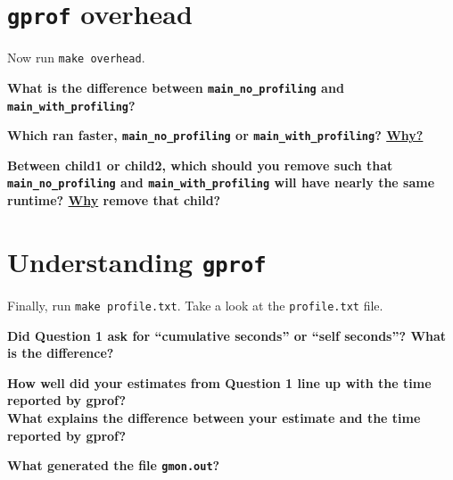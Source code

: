 \documentclass{article}
\begin{document}
\section{\texttt{gprof} overhead}

Now run \texttt{make~overhead}.

\textbf{What is the difference between \texttt{main\_no\_profiling} and
  \texttt{main\_with\_profiling}?}
\vspace{2cm}

\textbf{Which ran faster, \texttt{main\_no\_profiling} or
  \texttt{main\_with\_profiling}? \ul{Why?}}
\vspace{3cm}

\textbf{Between child1 or child2, which should you remove such that
  \texttt{main\_no\_profiling} and \texttt{main\_with\_profiling} will have
  nearly the same runtime? \ul{Why} remove that child?}

\newpage
\section{Understanding \texttt{gprof}}

Finally, run \texttt{make~profile.txt}. Take a look at the
\texttt{profile.txt} file.

\textbf{Did Question 1 ask for ``cumulative seconds'' or ``self seconds''?
  What is the difference?}
\vspace{3cm}

\textbf{How well did your estimates from Question 1 line up with the time
  reported by gprof?\\
  What explains the difference between your estimate and
  the time reported by gprof?}
\vspace{4cm}

\textbf{What generated the file \texttt{gmon.out}?}
\vspace{3cm}
\end{document}
